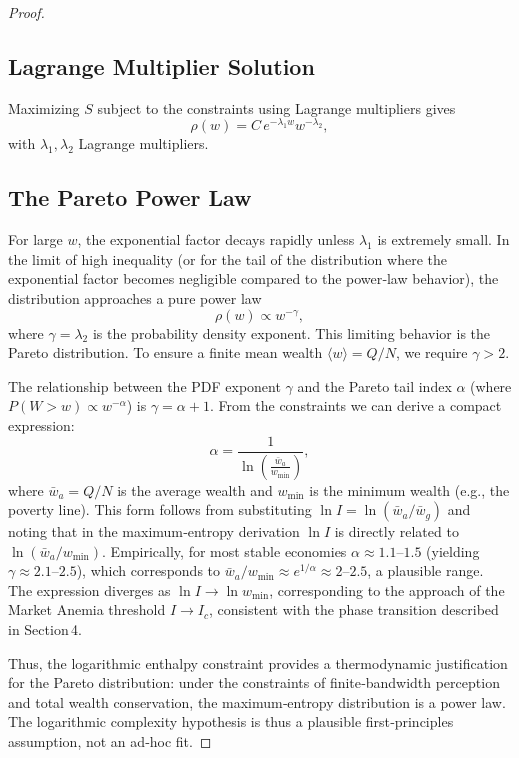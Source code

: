 \documentclass{article}
\begin{document}
\begin{proof}
\subsection{Lagrange Multiplier Solution}
Maximizing $S$ subject to the constraints using Lagrange multipliers gives
\[
\rho(w) = C \, e^{-\lambda_1 w} w^{-\lambda_2},
\]
with $\lambda_1, \lambda_2$ Lagrange multipliers.

\subsection{The Pareto Power Law}
For large $w$, the exponential factor decays rapidly unless $\lambda_1$ is extremely small. In the limit of high inequality (or for the tail of the distribution where the exponential factor becomes negligible compared to the power‑law behavior), the distribution approaches a pure power law
\[
\rho(w) \propto w^{-\gamma},
\]
where $\gamma = \lambda_2$ is the probability density exponent. This limiting behavior is the Pareto distribution. To ensure a finite mean wealth $\langle w \rangle = Q/N$, we require $\gamma > 2$.

The relationship between the PDF exponent $\gamma$ and the Pareto tail index $\alpha$ (where $P(W>w) \propto w^{-\alpha}$) is $\gamma = \alpha + 1$. From the constraints we can derive a compact expression:
\[
\alpha = \frac{1}{\ln\left( \frac{\bar{w}_a}{w_{\min}} \right)},
\]
where $\bar{w}_a = Q/N$ is the average wealth and $w_{\min}$ is the minimum wealth (e.g., the poverty line). This form follows from substituting $\ln I = \ln(\bar{w}_a / \bar{w}_g)$ and noting that in the maximum‑entropy derivation $\ln I$ is directly related to $\ln(\bar{w}_a / w_{\min})$. Empirically, for most stable economies $\alpha \approx 1.1$–$1.5$ (yielding $\gamma \approx 2.1$–$2.5$), which corresponds to $\bar{w}_a / w_{\min} \approx e^{1/\alpha} \approx 2$–$2.5$, a plausible range. The expression diverges as $\ln I \to \ln w_{\min}$, corresponding to the approach of the Market Anemia threshold $I \to I_c$, consistent with the phase transition described in Section 4.

Thus, the logarithmic enthalpy constraint provides a thermodynamic justification for the Pareto distribution: under the constraints of finite‑bandwidth perception and total wealth conservation, the maximum‑entropy distribution is a power law. The logarithmic complexity hypothesis is thus a plausible first‑principles assumption, not an ad‑hoc fit.


\end{proof}
\end{document}
